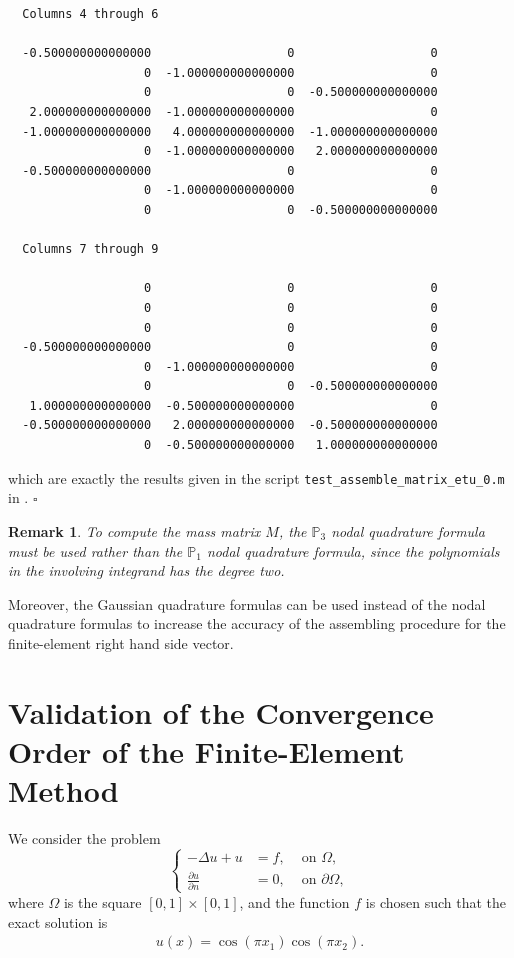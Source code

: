 \documentclass[11pt,a4paper,center,notitlepage]{article}
\numberwithin{equation}{section}
\newtheorem{remark}{Remark}[section]
\begin{document}
\begin{verbatim}
  Columns 4 through 6

  -0.500000000000000                   0                   0
                   0  -1.000000000000000                   0
                   0                   0  -0.500000000000000
   2.000000000000000  -1.000000000000000                   0
  -1.000000000000000   4.000000000000000  -1.000000000000000
                   0  -1.000000000000000   2.000000000000000
  -0.500000000000000                   0                   0
                   0  -1.000000000000000                   0
                   0                   0  -0.500000000000000

  Columns 7 through 9

                   0                   0                   0
                   0                   0                   0
                   0                   0                   0
  -0.500000000000000                   0                   0
                   0  -1.000000000000000                   0
                   0                   0  -0.500000000000000
   1.000000000000000  -0.500000000000000                   0
  -0.500000000000000   2.000000000000000  -0.500000000000000
                   0  -0.500000000000000   1.000000000000000
\end{verbatim}
which are exactly the results given in the script \verb|test_assemble_matrix_etu_0.m| in \cite{1}. \hfill $\square$

\begin{remark}
To compute the mass matrix $M$, the $\mathbb{P}_3$ nodal quadrature formula must be used rather than the $\mathbb{P}_1$ nodal quadrature formula, since the polynomials in the involving integrand has the degree two.
\end{remark}
Moreover, the Gaussian quadrature formulas can be used instead of the nodal quadrature formulas to increase the accuracy of the assembling procedure for the finite-element right hand side vector.

\section{Validation of the Convergence Order of the Finite-Element Method}
We consider the problem
\begin{equation}
\left\{ \begin{split}
 - \Delta u + u &= f, & \mbox{ on } \Omega ,\\
\frac{{\partial u}}{{\partial n}} &= 0, & \mbox{ on } \partial \Omega ,
\end{split} \right.
\end{equation}
where $\Omega$ is the square $\left[0,1\right]\times \left[0,1\right]$, and the function $f$ is chosen such that the exact solution is 
\begin{align}
u\left( x \right) = \cos \left( {\pi {x_1}} \right)\cos \left( {\pi {x_2}} \right).
\end{align}
\end{document}
